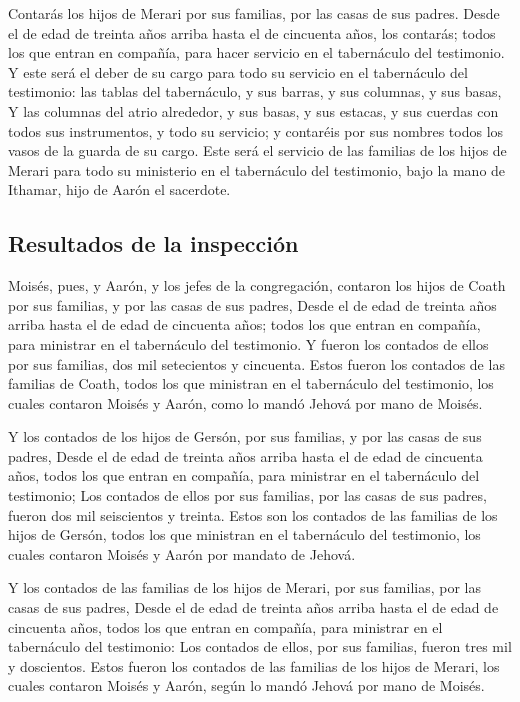  Contarás los hijos de Merari por sus familias, por las
casas de sus padres.  Desde el de edad de treinta años
arriba hasta el de cincuenta años, los contarás; todos los que entran en
compañía, para hacer servicio en el tabernáculo del testimonio.
 Y este será el deber de su cargo para todo su servicio
en el tabernáculo del testimonio: las tablas del tabernáculo, y sus
barras, y sus columnas, y sus basas,  Y las columnas del
atrio alrededor, y sus basas, y sus estacas, y sus cuerdas con todos sus
instrumentos, y todo su servicio; y contaréis por sus nombres todos los
vasos de la guarda de su cargo.  Este será el servicio de
las familias de los hijos de Merari para todo su ministerio en el
tabernáculo del testimonio, bajo la mano de Ithamar, hijo de Aarón el
sacerdote.

\hypertarget{resultados-de-la-inspecciuxf3n}{%
\subsection{Resultados de la
inspección}\label{resultados-de-la-inspecciuxf3n}}

 Moisés, pues, y Aarón, y los jefes de la congregación,
contaron los hijos de Coath por sus familias, y por las casas de sus
padres,  Desde el de edad de treinta años arriba hasta el
de edad de cincuenta años; todos los que entran en compañía, para
ministrar en el tabernáculo del testimonio.  Y fueron los
contados de ellos por sus familias, dos mil setecientos y cincuenta.
 Estos fueron los contados de las familias de Coath,
todos los que ministran en el tabernáculo del testimonio, los cuales
contaron Moisés y Aarón, como lo mandó Jehová por mano de Moisés.

 Y los contados de los hijos de Gersón, por sus familias,
y por las casas de sus padres,  Desde el de edad de
treinta años arriba hasta el de edad de cincuenta años, todos los que
entran en compañía, para ministrar en el tabernáculo del testimonio;
 Los contados de ellos por sus familias, por las casas de
sus padres, fueron dos mil seiscientos y treinta.  Estos
son los contados de las familias de los hijos de Gersón, todos los que
ministran en el tabernáculo del testimonio, los cuales contaron Moisés y
Aarón por mandato de Jehová.

 Y los contados de las familias de los hijos de Merari,
por sus familias, por las casas de sus padres,  Desde el
de edad de treinta años arriba hasta el de edad de cincuenta años, todos
los que entran en compañía, para ministrar en el tabernáculo del
testimonio:  Los contados de ellos, por sus familias,
fueron tres mil y doscientos.  Estos fueron los contados
de las familias de los hijos de Merari, los cuales contaron Moisés y
Aarón, según lo mandó Jehová por mano de Moisés.

